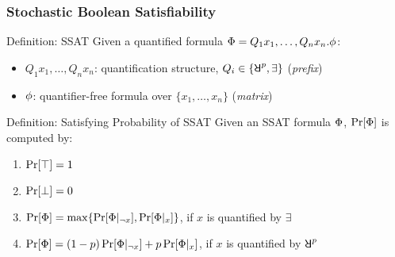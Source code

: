 \begin{frame}
      \frametitle{Stochastic Boolean Satisfiability}
      \begin{block}{Definition: SSAT}
            Given a quantified formula $\Phi=Q_1 x_1,\ldots,Q_n x_n.\phi$:
            \begin{itemize}
                  \item $Q_1 x_1,\ldots,Q_n x_n$: quantification structure, $Q_i \in \{\random{p},\exists\}$ (\emph{prefix})
                  \item $\phi$: quantifier-free formula over $\{x_1,\ldots,x_n\}$ (\emph{matrix})
            \end{itemize}
      \end{block}
      \pause
      \begin{block}{Definition: Satisfying Probability of SSAT}
            Given an SSAT formula $\Phi$, $\Pr[\Phi]$ is computed by:
            \begin{enumerate}
                  \item $\Pr[\top]=1$
                  \item $\Pr[\bot]=0$
                  \item $\Pr[\Phi]=\max\{\Pr[\Phi|_{\lnot x}],\Pr[\Phi|_{x}]\}$, if $x$ is quantified by $\exists$
                  \item $\Pr[\Phi]=(1-p)\Pr[\Phi|_{\lnot x}]+p\Pr[\Phi|_{x}]$, if $x$ is quantified by $\random{p}$
            \end{enumerate}
      \end{block}
\end{frame}

